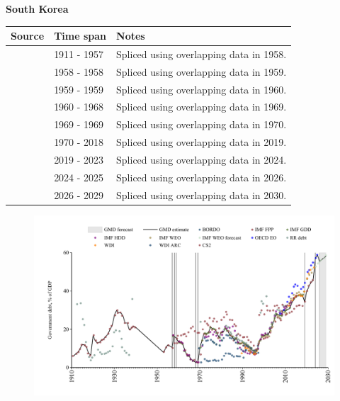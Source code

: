 \documentclass[12pt,a4paper,landscape]{article}
\begin{document}
\begin{adjustbox}{max totalsize={\paperwidth}{\paperheight},center}
\begin{minipage}[t][\textheight][t]{\textwidth}
\vspace*{0.5cm}
{}
\begin{center}
{\Large\bfseries South Korea}
\end{center}
\vspace{0.5cm}
\begin{table}[H]
\centering
\small
\begin{tabular}{|l|l|l|}
\hline
\textbf{Source} & \textbf{Time span} & \textbf{Notes} \\
\hline
\rowcolor{white}\cite{CS2_KOR}& 1911 - 1957 &Spliced using overlapping data in 1958.\\
\rowcolor{lightgray}\cite{IMF_GDD}& 1958 - 1958 &Spliced using overlapping data in 1959.\\
\rowcolor{white}\cite{IMF_FPP}& 1959 - 1959 &Spliced using overlapping data in 1960.\\
\rowcolor{lightgray}\cite{IMF_GDD}& 1960 - 1968 &Spliced using overlapping data in 1969.\\
\rowcolor{white}\cite{IMF_FPP}& 1969 - 1969 &Spliced using overlapping data in 1970.\\
\rowcolor{lightgray}\cite{IMF_GDD}& 1970 - 2018 &Spliced using overlapping data in 2019.\\
\rowcolor{white}\cite{IMF_FPP}& 2019 - 2023 &Spliced using overlapping data in 2024.\\
\rowcolor{lightgray}\cite{OECD_EO}& 2024 - 2025 &Spliced using overlapping data in 2026.\\
\rowcolor{white}\cite{IMF_WEO_forecast}& 2026 - 2029 &Spliced using overlapping data in 2030.\\
\hline
\end{tabular}
\end{table}
\begin{figure}[H]
\centering
\includegraphics[width=\textwidth,height=0.6\textheight,keepaspectratio]{graphs/KOR_govdebt_GDP.pdf}
\end{figure}
\end{minipage}
\end{adjustbox}
\end{document}
